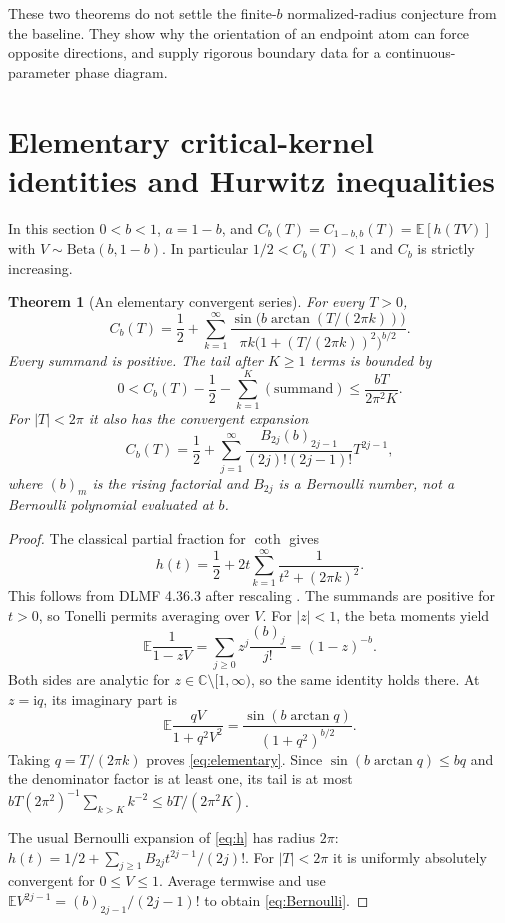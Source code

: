 \documentclass[11pt]{article}
\numberwithin{equation}{section}
\newtheorem{theorem}{Theorem}[section]
\theoremstyle{definition}\newtheorem{definition}[theorem]{Definition}
\theoremstyle{remark}\newtheorem{remark}[theorem]{Remark}
\newcommand{\C}{\mathbb C}
\newcommand{\E}{\mathbb E}
\newcommand{\ii}{\mathrm i}
\newcommand{\cut}{\C\setminus[1,\infty)}
\begin{document}
These two theorems do not settle the finite-$b$ normalized-radius
conjecture from the baseline. They show why the orientation of an
endpoint atom can force opposite directions, and supply rigorous
boundary data for a continuous-parameter phase diagram.

\section{Elementary critical-kernel identities and Hurwitz inequalities}
\label{sec:criticalidentities}

In this section $0<b<1$, $a=1-b$, and
$C_b(T)=C_{1-b,b}(T)=\E[h(TV)]$ with
$V\sim\mathrm{Beta}(b,1-b)$. In particular $1/2<C_b(T)<1$ and
$C_b$ is strictly increasing.

\begin{theorem}[An elementary convergent series]\label{thm:elementary}
For every $T>0$,
\begin{equation}\label{eq:elementary}
 C_b(T)=\frac12+\sum_{k=1}^\infty
 \frac{\sin\!\bigl(b\arctan(T/(2\pi k))\bigr)}
 {\pi k\bigl(1+(T/(2\pi k))^2\bigr)^{b/2}}.
\end{equation}
Every summand is positive. The tail after $K\ge1$ terms is bounded by
\begin{equation}\label{eq:elementarytail}
 0<C_b(T)-\frac12-\sum_{k=1}^K(\text{summand})
 \le\frac{bT}{2\pi^2K}.
\end{equation}
For $|T|<2\pi$ it also has the convergent expansion
\begin{equation}\label{eq:Bernoulli}
 C_b(T)=\frac12+\sum_{j=1}^\infty
 \frac{B_{2j}(b)_{2j-1}}{(2j)!(2j-1)!}T^{2j-1},
\end{equation}
where $(b)_m$ is the rising factorial and $B_{2j}$ is a Bernoulli
number, not a Bernoulli polynomial evaluated at $b$.
\end{theorem}
\begin{proof}
The classical partial fraction for $\coth$ gives
\begin{equation}\label{eq:hpartial}
 h(t)=\frac12+2t\sum_{k=1}^\infty\frac1{t^2+(2\pi k)^2}.
\end{equation}
This follows from DLMF 4.36.3 after rescaling
\cite{dlmf-hyperbolic}. The summands are positive for $t>0$, so
Tonelli permits averaging over $V$.
For $|z|<1$, the beta moments yield
\[
 \E\frac1{1-zV}=\sum_{j\ge0}z^j\frac{(b)_j}{j!}=(1-z)^{-b}.
\]
Both sides are analytic for $z\in\cut$, so the same identity holds
there. At $z=\ii q$, its imaginary part is
\[
 \E\frac{qV}{1+q^2V^2}
 =\frac{\sin(b\arctan q)}{(1+q^2)^{b/2}}.
\]
Taking $q=T/(2\pi k)$ proves \eqref{eq:elementary}.
Since $\sin(b\arctan q)\le bq$ and the denominator factor is at
least one, its tail is at most
$bT(2\pi^2)^{-1}\sum_{k>K}k^{-2}\le bT/(2\pi^2K)$.

The usual Bernoulli expansion of \eqref{eq:h} has radius $2\pi$:
$h(t)=1/2+\sum_{j\ge1}B_{2j}t^{2j-1}/(2j)!$.
For $|T|<2\pi$ it is uniformly absolutely convergent for
$0\le V\le1$. Average termwise and use
$\E V^{2j-1}=(b)_{2j-1}/(2j-1)!$ to obtain
\eqref{eq:Bernoulli}.
\end{proof}
\end{document}
